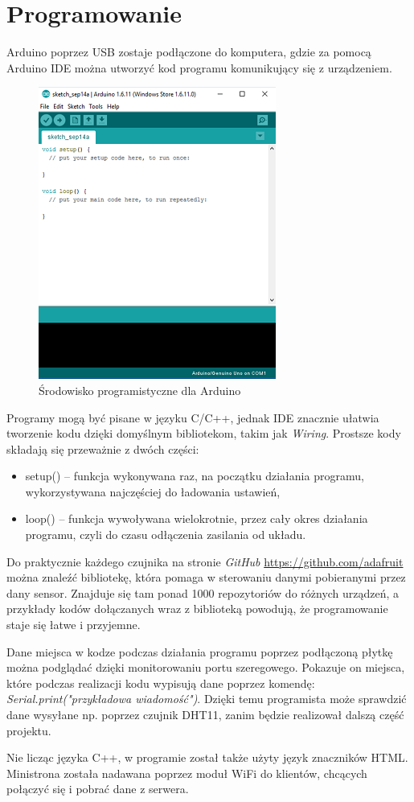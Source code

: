 \documentclass[polish, 11pt]{article}
\begin{document}
\section{Programowanie}
Arduino poprzez USB zostaje podłączone do komputera, gdzie za pomocą Arduino IDE można utworzyć kod programu komunikujący się z urządzeniem. 
\begin{figure}[H]
    \centering
    \includegraphics {arduinoide.png}
\caption{Środowisko programistyczne dla Arduino}
\end{figure}
Programy mogą być pisane w języku C/C++, jednak IDE znacznie ułatwia tworzenie kodu dzięki domyślnym bibliotekom, takim jak \textit{Wiring}. Prostsze kody składają się przeważnie z dwóch części:
\begin{itemize}
    \item setup() – funkcja wykonywana raz, na początku działania programu, wykorzystywana najczęściej do ładowania ustawień,
    \item loop() – funkcja wywoływana wielokrotnie, przez cały okres działania programu, czyli do czasu odłączenia zasilania od układu.
\end{itemize}
\par Do praktycznie każdego czujnika na stronie \textit{GitHub} \url{https://github.com/adafruit} można znaleźć bibliotekę, która pomaga w sterowaniu danymi pobieranymi przez dany sensor. Znajduje się tam ponad 1000 repozytoriów do różnych urządzeń, a przykłady kodów dołączanych wraz z biblioteką powodują, że programowanie staje się łatwe i przyjemne. 
\par Dane miejsca w kodze podczas działania programu poprzez podłączoną płytkę można podglądać dzięki monitorowaniu portu szeregowego. Pokazuje on miejsca, które podczas realizacji kodu wypisują dane poprzez komendę: \textit{Serial.print("przykładowa wiadomość")}. Dzięki temu programista może sprawdzić dane wysyłane np. poprzez czujnik DHT11, zanim będzie realizował dalszą część projektu. 
\par Nie licząc języka C++, w programie został także użyty język znaczników HTML. Ministrona została nadawana poprzez moduł WiFi do klientów, chcących połączyć się i pobrać dane z serwera. 
\end{document}
